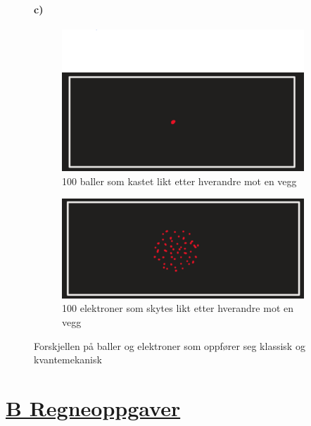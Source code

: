 \documentclass{article}
\begin{document}
\begin{figure}
\subsection*{c)}
    \centering
    \begin{subfigure}{.49\textwidth}
      \centering
      \includegraphics[width = \textwidth]{Figures/A.2.b.1.png}
      \caption{100 baller som kastet likt etter hverandre mot en vegg}
      \label{fig: 100 baller}
    \end{subfigure}
    \hfill
    \begin{subfigure}{.49\textwidth}
      \centering
      \includegraphics[width = \textwidth]{Figures/A.2.b.2.png}
      \caption{100 elektroner som skytes likt etter hverandre mot en vegg}
      \label{fig: 100 elektroner}
    \end{subfigure}
    \hfill
    \caption{Forskjellen på baller og elektroner som oppfører seg klassisk og kvantemekanisk}
    \label{fig: A.2.b}
\end{figure}

\newpage
\part*{\underline{B Regneoppgaver}}
\end{document}

